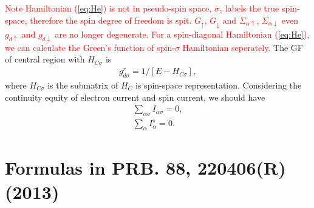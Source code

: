 \documentclass[aps,prb,superscriptaddress]{revtex4-2}
\begin{document}
\textcolor{red}{Note Hamiltonian (\ref{eq:He}) is not in pseudo-spin space, $\sigma_z$ labels the true spin-space, therefore the spin degree of freedom is spit. $G_{\uparrow}$, $G_{\downarrow}$ and $\Sigma_{\alpha\uparrow}$, $\Sigma_{\alpha\downarrow}$ even $g_{d\uparrow}$ and $g_{d\downarrow}$ are no longer degenerate. For a spin-diagonal Hamiltonian (\ref{eq:He}), we can calculate the Green's function of spin-$\sigma$ Hamiltonian seperately.} The GF of central region with $H_{C\sigma}$ is
\begin{eqnarray}
g_{d\sigma}^r = 1/[E-H_{C\sigma}],
\end{eqnarray}
where $H_{C\sigma}$ is the submatrix of $H_{C}$ is spin-space representation. %
Considering the continuity equity of electron current and spin current, we should have
\begin{gather}
\sum_{\alpha\sigma}I_{\alpha\sigma} = 0,\\
\sum_{\alpha}I_{\alpha}^s = 0.
\end{gather}




\section{Formulas in PRB. 88, 220406(R) (2013)}
\end{document}
